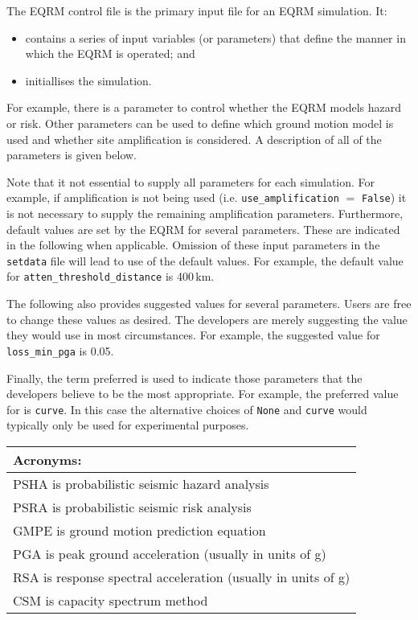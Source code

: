 
The EQRM control file is the primary input file for an EQRM
simulation. It:
\begin{itemize}
\item contains a series of input variables (or parameters) that define
the manner in which the EQRM is operated; and
\item initiallises the simulation.
\end{itemize}
For example, there is a parameter to control whether the EQRM models
hazard or risk. Other parameters can be used to define which ground
motion model is used and whether site amplification is considered. A
description of all of the parameters is given below.

Note that it not essential to supply all parameters for each
simulation. For example, if amplification is not being used (i.e.
\texttt{use\_amplification} $=$ \texttt{False}) it is not necessary
to supply the remaining amplification parameters. Furthermore,
default values are set by the EQRM for several parameters. These are
indicated in the following when applicable. Omission of these input
parameters in the \texttt{setdata} file will lead to use of the
default values. For example, the default value for
\texttt{atten\_threshold\_distance} is 400\,km.

The following also provides suggested values for several parameters.
Users are free to change these values as desired. The developers are
merely suggesting the value they would use in most circumstances.
For example, the suggested value for \texttt{loss\_min\_pga} is
0.05.

Finally, the term preferred is used to indicate those parameters
that the developers believe to be the most appropriate. For example,
the preferred value for  is
\texttt{curve}. In this case the alternative choices of
\texttt{None} and \texttt{curve} would typically only be used for
experimental purposes.


\vspace{2em}

\begin{tabular}{l}
\hline
\textbf{Acronyms}: \\
\hline
PSHA is probabilistic seismic hazard analysis \\
PSRA is probabilistic seismic risk analysis  \\
GMPE is ground motion prediction equation \\
PGA is peak ground acceleration (usually in units of g) \\
RSA is response spectral acceleration (usually in units of g) \\
CSM is capacity spectrum method \\
\hline
\end{tabular}

